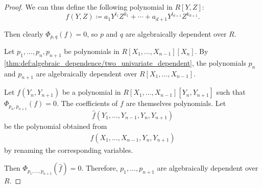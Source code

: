 \begin{proof}
  We can thus define the following polynomial in \( R[Y, Z] \):
  \begin{equation*}
    f(Y, Z) \coloneqq a_1 Y^{l_1} Z^{k_1} + \cdots + a_{d+1} Y^{l_{d+1}} Z^{k_{d+1}}.
  \end{equation*}

  Then clearly \( \Phi_{p,q}(f) = 0 \), so \( p \) and \( q \) are algebraically dependent over \( R \).

   Let \( p_1, \ldots, p_n, p_{n+1} \) be polynomials in \( R[X_1, \ldots, X_{n-1}][X_n] \). By \cref{thm:def:algebraic_dependence/two_univariate_dependent}, the polynomials \( p_n \) and \( p_{n+1} \) are algebraically dependent over \( R[X_1, \ldots, X_{n-1}] \).

  Let \( f(Y_n, Y_{n+1}) \) be a polynomial in \( R[X_1, \ldots, X_{n-1}][Y_n, Y_{n+1}] \) such that \( \Phi_{p_n,p_{n+1}}(f) = 0 \). The coefficients of \( f \) are themselves polynomials. Let
  \begin{equation*}
    \widehat{f}(Y_1, \ldots, Y_{n-1}, Y_n, Y_{n+1})
  \end{equation*}
  be the polynomial obtained from
  \begin{align*}
    f(X_1, \ldots, X_{n-1}, Y_n, Y_{n+1})
  \end{align*}
  by renaming the corresponding variables.

  Then \( \Phi_{p_1,\ldots,p_{n+1}}(\widehat{f}) = 0 \). Therefore, \( p_1, \ldots, p_{n+1} \) are algebraically dependent over \( R \).
\end{proof}

